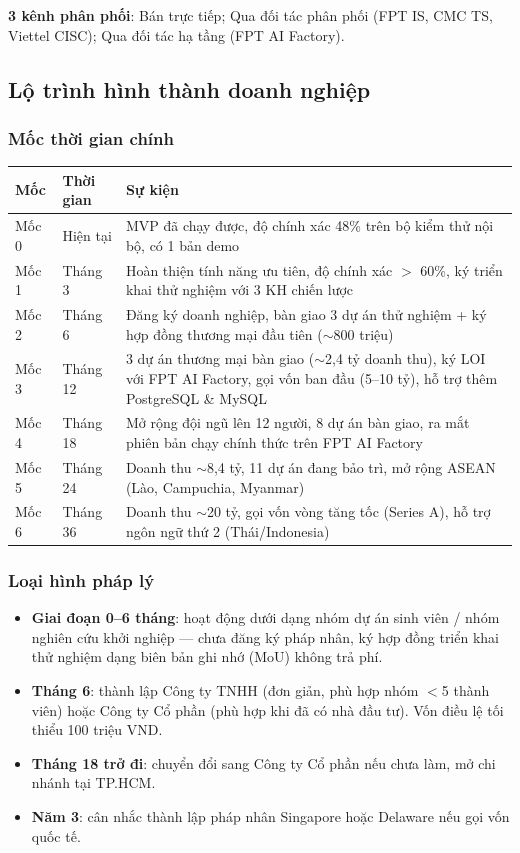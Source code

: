 \documentclass[11pt,a4paper]{article}
\begin{document}
\textbf{3 kênh phân phối}: Bán trực tiếp; Qua đối tác phân phối (FPT IS, CMC TS, Viettel CISC); Qua đối tác hạ tầng (FPT AI Factory).

\subsection{Lộ trình hình thành doanh nghiệp}

\subsubsection{Mốc thời gian chính}

\begin{longtable}{|L{1.6cm}|L{1.8cm}|L{11.5cm}|}
\hline
{}\textbf{Mốc} & \textbf{Thời gian} & \textbf{Sự kiện} \\
\hline\endhead

Mốc 0 & Hiện tại & MVP đã chạy được, độ chính xác 48\% trên bộ kiểm thử nội bộ, có 1 bản demo \\ \hline
Mốc 1 & Tháng 3 & Hoàn thiện tính năng ưu tiên, độ chính xác $>$ 60\%, ký triển khai thử nghiệm với 3 KH chiến lược \\ \hline
Mốc 2 & Tháng 6 & Đăng ký doanh nghiệp, bàn giao 3 dự án thử nghiệm + ký hợp đồng thương mại đầu tiên ($\sim$800 triệu) \\ \hline
Mốc 3 & Tháng 12 & 3 dự án thương mại bàn giao ($\sim$2,4 tỷ doanh thu), ký LOI với FPT AI Factory, gọi vốn ban đầu (5--10 tỷ), hỗ trợ thêm PostgreSQL \& MySQL \\ \hline
Mốc 4 & Tháng 18 & Mở rộng đội ngũ lên 12 người, 8 dự án bàn giao, ra mắt phiên bản chạy chính thức trên FPT AI Factory \\ \hline
Mốc 5 & Tháng 24 & Doanh thu $\sim$8,4 tỷ, 11 dự án đang bảo trì, mở rộng ASEAN (Lào, Campuchia, Myanmar) \\ \hline
Mốc 6 & Tháng 36 & Doanh thu $\sim$20 tỷ, gọi vốn vòng tăng tốc (Series A), hỗ trợ ngôn ngữ thứ 2 (Thái/Indonesia) \\ \hline

\end{longtable}

\subsubsection{Loại hình pháp lý}

\begin{itemize}
\item \textbf{Giai đoạn 0--6 tháng}: hoạt động dưới dạng nhóm dự án sinh viên / nhóm nghiên cứu khởi nghiệp --- chưa đăng ký pháp nhân, ký hợp đồng triển khai thử nghiệm dạng biên bản ghi nhớ (MoU) không trả phí.
\item \textbf{Tháng 6}: thành lập Công ty TNHH (đơn giản, phù hợp nhóm $<$5 thành viên) hoặc Công ty Cổ phần (phù hợp khi đã có nhà đầu tư). Vốn điều lệ tối thiểu 100 triệu VND.
\item \textbf{Tháng 18 trở đi}: chuyển đổi sang Công ty Cổ phần nếu chưa làm, mở chi nhánh tại TP.HCM.
\item \textbf{Năm 3}: cân nhắc thành lập pháp nhân Singapore hoặc Delaware nếu gọi vốn quốc tế.
\end{itemize}
\end{document}
